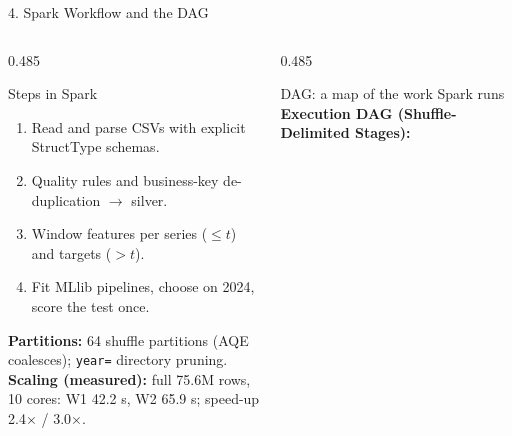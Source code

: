 \documentclass[aspectratio=169,10pt]{beamer}
\begin{document}
\begin{frame}{4. Spark Workflow and the DAG}
  \begin{columns}[T,onlytextwidth]
    \begin{column}{0.485\textwidth}
      \begin{block}{Steps in Spark}
        \small
        \begin{enumerate}\footnotesize
          \item Read and parse CSVs with explicit StructType schemas.
          \item Quality rules and business-key de-duplication $\to$ silver.
          \item Window features per series ($\le t$) and targets ($> t$).
          \item Fit MLlib pipelines, choose on 2024, score the test once.
        \end{enumerate}
        \vspace{0.2em}
        {\footnotesize\textbf{\color{refRed}Partitions:} 64 shuffle partitions (AQE coalesces); \texttt{year=} directory pruning.}\\[0.2em]
        {\footnotesize\textbf{Scaling (measured):} full 75.6M rows, 10 cores: W1 42.2 s, W2 65.9 s; speed-up 2.4$\times$ / 3.0$\times$.}
      \end{block}
    \end{column}

    \begin{column}{0.485\textwidth}
      \begin{block}{DAG: a map of the work Spark runs}
        \footnotesize
        \textbf{Execution DAG (Shuffle-Delimited Stages):}
        \begin{center}
\end{center}
\end{block}
\end{column}
\end{columns}
\end{frame}
\end{document}
